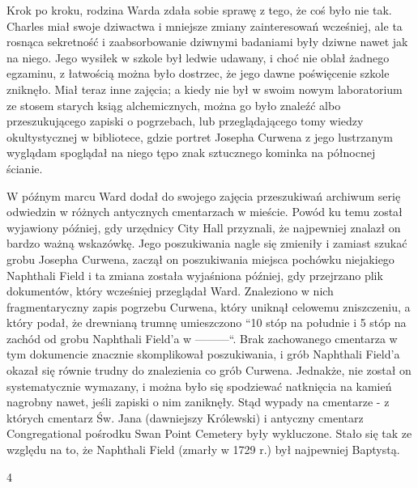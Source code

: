 Krok po kroku, rodzina Warda zdała sobie sprawę z tego, że coś było nie tak. Charles miał swoje dziwactwa i mniejsze zmiany zainteresowań wcześniej, ale ta rosnąca sekretność i zaabsorbowanie dziwnymi badaniami były dziwne nawet jak na niego. Jego wysiłek w szkole był ledwie udawany, i choć nie oblał żadnego egzaminu, z łatwością można było dostrzec, że jego dawne poświęcenie szkole zniknęło. Miał teraz inne zajęcia; a kiedy nie był w swoim nowym laboratorium ze stosem starych ksiąg alchemicznych, można go było znaleźć albo przeszukującego zapiski o pogrzebach, lub przeglądającego tomy wiedzy okultystycznej w bibliotece, gdzie portret Josepha Curwena z jego lustrzanym wyglądam spoglądał na niego tępo znak sztucznego kominka na północnej ścianie.

W późnym marcu Ward dodał do swojego zajęcia przeszukiwań archiwum serię odwiedzin w różnych antycznych cmentarzach w mieście. Powód ku temu został wyjawiony później, gdy urzędnicy City Hall przyznali, że najpewniej znalazł on bardzo ważną wskazówkę. Jego poszukiwania nagle się zmieniły i zamiast szukać grobu Josepha Curwena, zaczął on poszukiwania miejsca pochówku niejakiego Naphthali Field i ta zmiana została wyjaśniona później, gdy przejrzano plik dokumentów, który wcześniej przeglądał Ward. Znaleziono w nich fragmentaryczny zapis pogrzebu Curwena, który uniknął celowemu zniszczeniu, a który podał, że drewnianą trumnę umieszczono ``10 stóp na południe i 5 stóp na zachód od grobu Naphthali Field'a w ———``. Brak zachowanego cmentarza w tym dokumencie znacznie skomplikował poszukiwania, i grób Naphthali Field'a okazał się równie trudny do znalezienia co grób Curwena. Jednakże, nie został on systematycznie wymazany, i można było się spodziewać natknięcia na kamień nagrobny nawet, jeśli zapiski o nim zaniknęły. Stąd wypady na cmentarze - z których cmentarz Św. Jana (dawniejszy Królewski) i antyczny cmentarz Congregational pośrodku Swan Point Cemetery były wykluczone. Stało się tak ze względu na to, że Naphthali Field (zmarły w 1729 r.) był najpewniej Baptystą. 

\begin{center}
4
\end{center}

